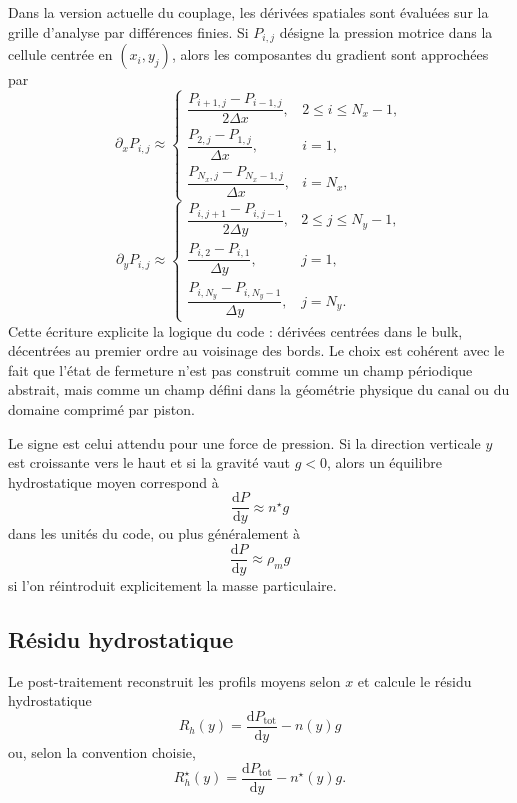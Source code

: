 \documentclass[11pt,a4paper]{article}
\begin{document}
Dans la version actuelle du couplage, les dérivées spatiales sont évaluées sur la grille d'analyse par différences finies. Si $P_{i,j}$ désigne la pression motrice dans la cellule centrée en $(x_i,y_j)$, alors les composantes du gradient sont approchées par
\begin{equation}
  \partial_x P_{i,j} \approx
  \begin{cases}
    \dfrac{P_{i+1,j}-P_{i-1,j}}{2\Delta x}, & 2\le i\le N_x-1,\\[1ex]
    \dfrac{P_{2,j}-P_{1,j}}{\Delta x}, & i=1,\\[1ex]
    \dfrac{P_{N_x,j}-P_{N_x-1,j}}{\Delta x}, & i=N_x,
  \end{cases}
\end{equation}
\begin{equation}
  \partial_y P_{i,j} \approx
  \begin{cases}
    \dfrac{P_{i,j+1}-P_{i,j-1}}{2\Delta y}, & 2\le j\le N_y-1,\\[1ex]
    \dfrac{P_{i,2}-P_{i,1}}{\Delta y}, & j=1,\\[1ex]
    \dfrac{P_{i,N_y}-P_{i,N_y-1}}{\Delta y}, & j=N_y.
  \end{cases}
\end{equation}
Cette écriture explicite la logique du code : dérivées centrées dans le bulk, décentrées au premier ordre au voisinage des bords. Le choix est cohérent avec le fait que l'état de fermeture n'est pas construit comme un champ périodique abstrait, mais comme un champ défini dans la géométrie physique du canal ou du domaine comprimé par piston.

Le signe est celui attendu pour une force de pression. Si la direction verticale $y$ est croissante vers le haut et si la gravité vaut $g<0$, alors un équilibre hydrostatique moyen correspond à
\begin{equation}
 \frac{\mathrm{d}P}{\mathrm{d}y} \approx n^{\star} g
\end{equation}
dans les unités du code, ou plus généralement à
\begin{equation}
 \frac{\mathrm{d}P}{\mathrm{d}y} \approx \rho_m g
\end{equation}
si l'on réintroduit explicitement la masse particulaire.

\subsection{Résidu hydrostatique}

Le post-traitement reconstruit les profils moyens selon $x$ et calcule le résidu hydrostatique
\begin{equation}
 R_h(y) = \frac{\mathrm{d}P_{\mathrm{tot}}}{\mathrm{d}y} - n(y)g
\end{equation}
ou, selon la convention choisie,
\begin{equation}
 R_h^{\star}(y) = \frac{\mathrm{d}P_{\mathrm{tot}}}{\mathrm{d}y} - n^{\star}(y)g.
\end{equation}
\end{document}
